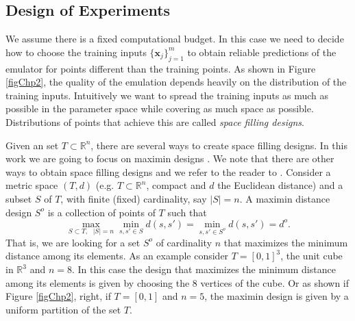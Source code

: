 \documentclass[12pt]{book}
\newcommand{\x}{\textbf{x}}
\begin{document}
\subsection{Design of Experiments }\label{secDesignofExperiments}



We assume there is a fixed computational budget. In this case we need to decide how
to choose the training inputs $\{\x_{j}\}_{j=1}^{m}$ to obtain reliable predictions 
of the emulator for points
different than the training points. As shown in Figure \ref{figChp2}, the quality
of the emulation depends heavily on the distribution of the training inputs. 
Intuitively we want to spread the training inputs as much as possible in the
parameter space while covering  as much space as possible. 
Distributions of points that achieve this are called \textit{space filling designs}.
\newline
 
Given an set $T\subset\mathbb{R}^{n}$, there are several ways to create space filling designs. 
In this work we are going to focus on maximin designs
\cite{johnson1990minimax}. We note that there are other ways to obtain space filling
designs and we refer to the reader to  \cite{pronzato2012design}. Consider a metric space $(T,d)$ (e.g.
$T\subset\mathbb{R}^{n}$, compact and $d$ the Euclidean distance) and a subset $S$ of $T$, 
with finite (fixed) cardinality, say $|S|=n$.
A maximin distance design $S^{o}$ is a collection of points of $T$  such that
\begin{equation*}
\max_{S\subset T,\text{ }|S|=n}\min_{s,s'\in S}d(s,s')=\min_{s,s'\in S^{o}}d(s,s')=d^{o}.
\end{equation*}
That is, we are looking for a set $S^{o}$ of cardinality $n$ that maximizes the minimum distance among 
its elements. As an example consider $T=[0,1]^{3}$, the unit cube in $\mathbb{R}^{3}$ and $n=8$. In 
this case the design that maximizes the minimum distance among its elements is given by choosing
 the 8 vertices of the cube. Or as shown if Figure \ref{figChp2}, right, if $T=[0,1]$ and $n=5$, 
the maximin design is given by a uniform partition  of the set $T$.
\end{document}
